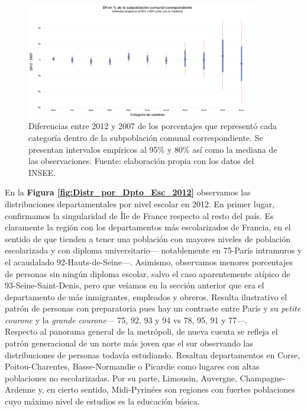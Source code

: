 \begin{figure}[h]
	\centering
	\includegraphics[width = 0.9\textwidth]{Figs/AED/Cambio_Pct_Comunal_Cat_Otros}
	\caption{Diferencias entre 2012 y 2007 de los porcentajes que representó cada categoría dentro de la subpoblación comunal correspondiente. Se presentan intervalos empíricos al 95\% y 80\% así como la mediana de las observaciones. Fuente: elaboración propia con los datos del INSEE.}
	\label{fig:Dif_Pct_Cat_Otros}	
\end{figure}

En la \textbf{Figura \ref{fig:Distr_por_Dpto_Esc_2012}} observamos las distribuciones departamentales por nivel escolar en 2012. En primer lugar, confirmamos la singularidad de Île de France respecto al resto del país. Es claramente la región con los departamentos más escolarizados de Francia, en el sentido de que tienden a tener una población con mayores niveles de población escolarizada y con diploma universitario--- notablemente en 75-París intramuros y el acaudalado 92-Hauts-de-Seine---. Asimismo, observamos menores porcentajes de personas sin ningún diploma escolar, salvo el caso aparentemente atípico de 93-Seine-Saint-Denis, pero que veíamos en la sección anterior que era el departamento de más inmigrantes, empleados y obreros. Resulta ilustrativo el patrón de personas con preparatoria pues hay un contraste entre París y su \textit{petite courone} y la \textit{grande courone}--- 75, 92, 93 y 94 vs 78, 95, 91 y 77---.\\ 

 Respecto al panorama general de la metrópoli, de nueva cuenta se refleja el patrón generacional de un norte más joven que el sur observando las distribuciones de personas todavía estudiando. Resaltan departamentos en Corse, Poitou-Charentes, Basse-Normandie o Picardie como lugares con altas poblaciones no escolarizadas. Por su parte, Limousin, Auvergne, Champagne-Ardenne y, en cierto sentido, Midi-Pyrinées son regiones con fuertes poblaciones cuyo máximo nivel de estudios es la educación básica.\\ 
 
